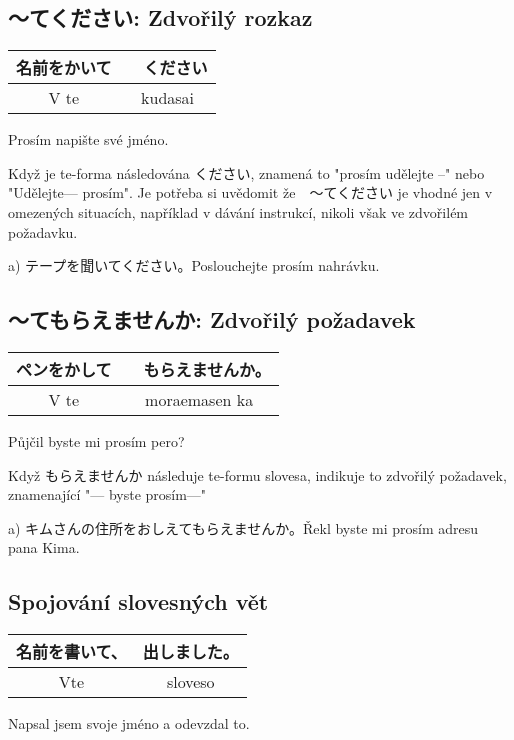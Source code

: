 \subsection{〜てください: Zdvořilý rozkaz}
\begin{center}
\begin{tabular}{||c|c||}
\hline
名前をかいて&　ください\\
\hline
V te & kudasai\\
\hline
\end{tabular}
\end{center}
Prosím napište své jméno.

Když je te-forma následována ください, znamená to "prosím udělejte --" nebo "Udělejte--- prosím". Je potřeba si uvědomit že　〜てください je vhodné jen v omezených situacích, například v dávání instrukcí, nikoli však ve zdvořilém požadavku.

a) テープを聞いてください。Poslouchejte prosím nahrávku.

\subsection{〜てもらえませんか:  Zdvořilý požadavek}
\begin{center}
\begin{tabular}{||c|c||}
\hline
ペンをかして&　もらえませんか。\\
\hline
V te & moraemasen ka\\
\hline
\end{tabular}
\end{center}
Půjčil byste mi prosím pero?

Když もらえませんか následuje te-formu slovesa, indikuje to zdvořilý požadavek, znamenající "--- byste prosím---"

a) キムさんの住所をおしえてもらえませんか。Řekl byste mi prosím adresu pana Kima.

\subsection{Spojování slovesných vět}
\begin{center}
\begin{tabular}{||c|c||}
\hline
名前を書いて、&出しました。\\
\hline
Vte& sloveso\\
\hline
\end{tabular}
\end{center}
Napsal jsem svoje jméno a odevzdal to.

